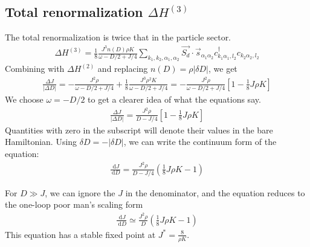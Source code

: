 \documentclass{revtex4-2}
\numberwithin{equation}{section}
\begin{document}
\subsection{Total renormalization \(\Delta H^{(3)}\)}
The total renormalization is twice that in the particle sector.
\begin{equation}\begin{aligned}
	\Delta H^{(3)} = \frac{1}{8}\frac{J^3 n(D) \rho K}{\omega - D/2 + J/4} \sum_{k_1,k_2,\alpha_1,\alpha_2} \vec{S_d}\cdot\vec{s}_{\alpha_1 \alpha_2} c^\dagger_{k_1\alpha_1,l_2}c_{k_2 \alpha_2,l_2}
\end{aligned}\end{equation}
Combining with \(\Delta H^{(2)}\) and replacing \(n(D) = \rho |\delta D|\), we get
\begin{equation}\begin{aligned}
	\frac{\Delta J}{|\Delta D|} = -\frac{J^2 \rho}{\omega - D/2 + J/4} + \frac{1}{8}\frac{J^3 \rho^2 K}{\omega - D/2 + J/4} = -\frac{J^2 \rho}{\omega - D/2 + J/4}\left[1 - \frac{1}{8}J\rho K\right] 
\end{aligned}\end{equation}
We choose \(\omega = -D/2\) to get a clearer idea of what the equations say. 
\begin{equation}\begin{aligned}
	\label{mchannel}
	\frac{\Delta J}{|\Delta D|} = \frac{J^2 \rho}{D - J/4}\left[1 - \frac{1}{8}J\rho K\right] 
\end{aligned}\end{equation}
Quantities with zero in the subscript will denote their values in the bare Hamiltonian. Using \(\delta D = -|\delta D|\), we can write the continuum form of the equation:
\begin{equation}\begin{aligned}
	\frac{\:\mathrm{d}J}{\:\mathrm{d}D} = \frac{J^2 \rho}{D - J/4}\left(\frac{1}{8}J\rho K - 1\right)
\end{aligned}\end{equation}

For \(D \gg J\), we can ignore the \(J\) in the denominator, and the equation reduces to the one-loop poor man's scaling form
\begin{equation}\begin{aligned}
	\label{pms_mchannel}
	\frac{\:\mathrm{d}J}{\:\mathrm{d}D} \simeq  \frac{J^2 \rho}{D}\left(\frac{1}{8}J\rho K - 1\right)
\end{aligned}\end{equation}
This equation has a stable fixed point at \(J^* = \frac{8}{\rho K}\).
\end{document}
